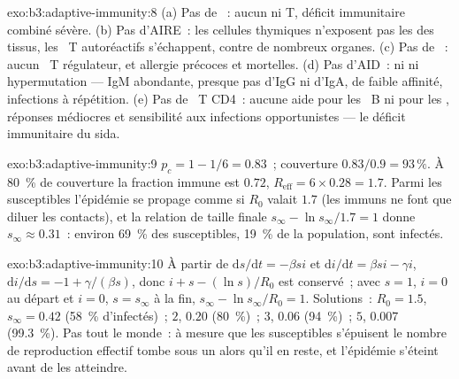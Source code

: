 \begin{solution}{exo:b3:adaptive-immunity:8}
(a) Pas de ~: aucun  ni T, déficit
immunitaire combiné sévère. (b) Pas d'AIRE~: les cellules thymiques
n'exposent pas les  des tissus, les ~T autoréactifs
s'échappent,  contre de nombreux organes. (c) Pas de
~: aucun ~T régulateur,  et allergie
précoces et mortelles. (d) Pas d'AID~: ni  ni
hypermutation --- IgM abondante, presque pas d'IgG ni d'IgA, 
de faible affinité, infections à répétition. (e) Pas de ~T
CD4~: aucune aide pour les ~B ni pour les ,
réponses  médiocres et sensibilité aux infections
opportunistes --- le déficit immunitaire du sida.
\end{solution}

\begin{solution}{exo:b3:adaptive-immunity:9}
$p_{c} = 1 - 1/6 = 0.83$~; couverture $0.83/0.9 = 93\,\%$. À \qty{80}{\%}
de couverture la fraction immune est $0.72$, $R_{\text{eff}} = 6\times 0.28
= 1.7$. Parmi les susceptibles l'épidémie se propage comme si $R_{0}$
valait $1.7$ (les immuns ne font que diluer les contacts), et la
relation de taille finale $s_{\infty} - \ln s_{\infty}/1.7 = 1$ donne
$s_{\infty}
\approx 0.31$~: environ \qty{69}{\%} des susceptibles, \qty{19}{\%} de
la population, sont infectés.
\end{solution}

\begin{solution}{exo:b3:adaptive-immunity:10}
À partir de $\mathrm{d}s/\mathrm{d}t = -\beta si$ et $\mathrm{d}i/\mathrm{d}t
= \beta si - \gamma i$, $\mathrm{d}i/\mathrm{d}s = -1 + \gamma/(\beta s)$,
donc $i + s - (\ln s)/R_{0}$ est conservé~; avec $s = 1$, $i = 0$ au
départ et $i = 0$, $s = s_{\infty}$ à la fin, $s_{\infty} - \ln
s_{\infty}/R_{0} = 1$. Solutions~: $R_{0} = 1.5$, $s_{\infty} = 0.42$
(\qty{58}{\%} d'infectés)~; $2$, $0.20$ (\qty{80}{\%})~; $3$, $0.06$
(\qty{94}{\%})~; $5$, $0.007$ (\qty{99.3}{\%}). Pas tout le monde~: à
mesure que les susceptibles s'épuisent le nombre de reproduction
effectif tombe sous un alors qu'il en reste, et l'épidémie s'éteint
avant de les atteindre.
\end{solution}

